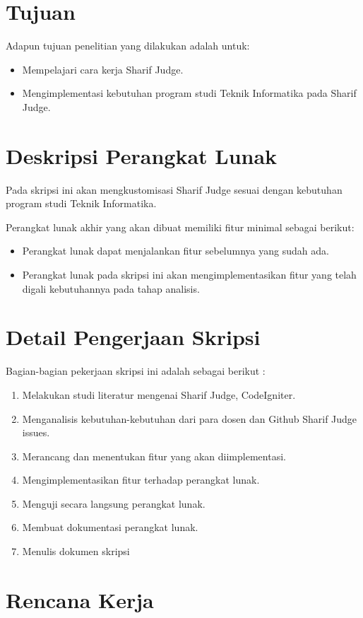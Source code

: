 \documentclass[a4paper,twoside]{article}
\begin{document}
\section{Tujuan}
Adapun tujuan penelitian yang dilakukan adalah untuk:
\begin{itemize}
	\item Mempelajari cara kerja Sharif Judge.
	\item Mengimplementasi kebutuhan program studi Teknik Informatika pada Sharif Judge.
\end{itemize}

\section{Deskripsi Perangkat Lunak}
Pada skripsi ini akan mengkustomisasi Sharif Judge sesuai dengan kebutuhan program studi Teknik Informatika.

Perangkat lunak akhir yang akan dibuat memiliki fitur minimal sebagai berikut:
\begin{itemize}
	\item Perangkat lunak dapat menjalankan fitur sebelumnya yang sudah ada.
	\item Perangkat lunak pada skripsi ini akan mengimplementasikan fitur yang telah digali kebutuhannya pada tahap analisis.
		
\end{itemize}

\section{Detail Pengerjaan Skripsi}
Bagian-bagian pekerjaan skripsi ini adalah sebagai berikut :
	\begin{enumerate}
		\item Melakukan studi literatur mengenai Sharif Judge, CodeIgniter.
		\item Menganalisis kebutuhan-kebutuhan dari para dosen dan Github Sharif Judge issues.
		\item Merancang dan menentukan fitur yang akan diimplementasi.
		\item Mengimplementasikan fitur terhadap perangkat lunak.
		\item Menguji secara langsung perangkat lunak.
		\item Membuat dokumentasi perangkat lunak.
		\item Menulis dokumen skripsi
	\end{enumerate}

\section{Rencana Kerja}
\end{document}
